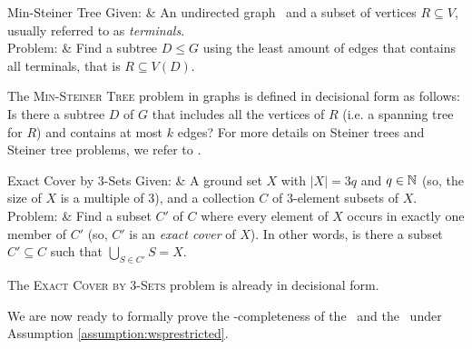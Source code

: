 \begin{problembox}[framed]{Min-Steiner Tree}
	Given: & An undirected graph \ugraph\ and a subset of vertices $R \subseteq V$, usually referred to as \textit{terminals}.\\
	Problem: & Find a subtree $D \leq G$ using the least amount of edges that contains all terminals, that is $R \subseteq V(D)$.
	\label{problem:steinertree}
\end{problembox}\vspace{1em}

The \textsc{Min-Steiner Tree} problem in graphs is defined in decisional form as follows: Is there a subtree $D$ of $G$ that includes all the vertices of $R$ (i.e. a spanning tree for $R$) and contains at most $k$ edges? For more details on Steiner trees and Steiner tree problems, we refer to \cite{KN12}.

\begin{problembox}[framed]{Exact Cover by $3$-Sets}
	Given: & A ground set $X$ with $|X| = 3q$ and $q \in \mathbb{N}$ (so, the size of $X$ is a multiple of $3$), and a collection $C$ of $3$-element subsets of $X$.\\
	Problem: & Find a subset $C'$ of $C$ where every element of $X$ occurs in exactly one member of $C'$ (so, $C'$ is an \textit{exact cover} of $X$). In other words, is there a subset $C' \subseteq C$ such that $\bigcup_{S \in C'} S = X.$
	\label{problem:exact3cover}
\end{problembox}\vspace{1em}

The \textsc{Exact Cover by $3$-Sets} problem is already in decisional form.\medskip

We are now ready to formally prove the \NP-completeness of the \WSP\ and the \WISP\ under Assumption \ref{assumption:wsprestricted}.

